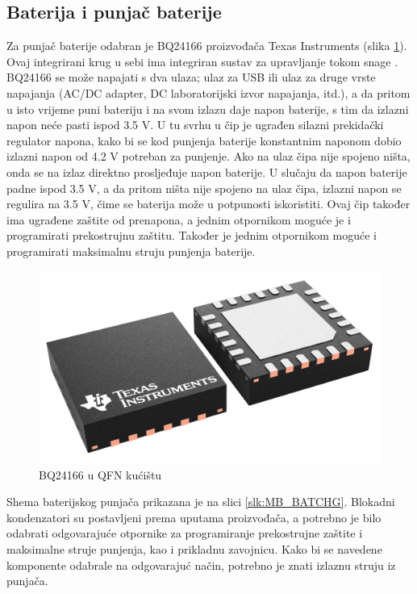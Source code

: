 \subsection{Baterija i punjač baterije}
Za punjač baterije odabran je BQ24166 proizvođača Texas Instruments (slika \ref{slk:BQ24166}). Ovaj integrirani krug u sebi ima integriran sustav za upravljanje tokom snage \cite{ti:bq24166}. BQ24166 se može napajati s dva ulaza; ulaz za USB ili ulaz za druge vrste napajanja (AC/DC adapter, DC laboratorijski izvor napajanja, itd.), a da pritom u isto vrijeme puni bateriju i na svom izlazu daje napon baterije, s tim da izlazni napon neće pasti ispod 3.5 V. U tu svrhu u čip je ugrađen silazni prekidački regulator napona, kako bi se kod punjenja baterije konstantnim naponom dobio izlazni napon od 4.2 V potreban za punjenje. Ako na ulaz čipa nije spojeno ništa, onda se na izlaz direktno prosljeđuje napon baterije. U slučaju da napon baterije padne ispod 3.5 V, a da pritom ništa nije spojeno na ulaz čipa, izlazni napon se regulira na 3.5 V, čime se baterija može u potpunosti iskoristiti. Ovaj čip također ima ugrađene zaštite od prenapona, a jednim otpornikom moguće je i programirati prekostrujnu zaštitu. Također je jednim otpornikom moguće i programirati maksimalnu struju punjenja baterije.
\begin{figure}[!hbt]
    \centering
    \includegraphics[width = 6 cm]{Figures/bq24166.png}
    \caption{BQ24166 u QFN kućištu}
    \label{slk:BQ24166}
\end{figure}

Shema baterijskog punjača prikazana je na slici \ref{slk:MB_BATCHG}. Blokadni kondenzatori su postavljeni prema uputama proizvođača, a potrebno je bilo odabrati odgovarajuće otpornike za programiranje prekostrujne zaštite i maksimalne struje punjenja, kao i prikladnu zavojnicu. Kako bi se navedene komponente odabrale na odgovarajuć način, potrebno je znati izlaznu struju iz punjača.

